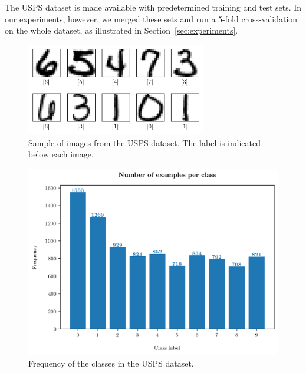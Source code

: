 \documentclass[runningheads]{llncs}
\begin{document}
The USPS dataset is made available with predetermined training and test sets. In our experiments, however, we merged these sets and run a 5-fold cross-validation on the whole dataset, as illustrated in Section~\ref{sec:experiments}. 

\begin{figure}
  \center
  \includegraphics[width=0.7\textwidth]{../img/digits.png}
  \caption{Sample of images from the USPS dataset. The label is indicated below each image.} 
  \label{fig:dataset:digits}
\end{figure}

\begin{figure}
  \center
  \includegraphics[width=1\textwidth]{../img/class_counts.png}
  \caption{Frequency of the classes in the USPS dataset.} 
  \label{fig:dataset:class_counts}
\end{figure}
\end{document}
